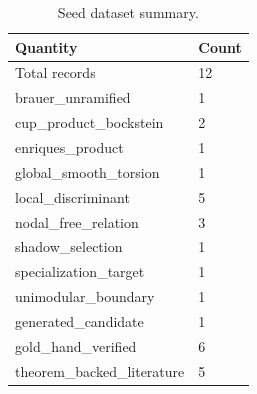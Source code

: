 \begin{table}[h]
\centering
\caption{Seed dataset summary.}
\label{tab:seed-dataset-summary}
\footnotesize
\begin{tabular}{|p{}|p{}|}
\hline
Quantity & Count \\
\hline
Total records & 12 \\
\hline
brauer\_\allowbreak{}unramified & 1 \\
cup\_\allowbreak{}product\_\allowbreak{}bockstein & 2 \\
enriques\_\allowbreak{}product & 1 \\
global\_\allowbreak{}smooth\_\allowbreak{}torsion & 1 \\
local\_\allowbreak{}discriminant & 5 \\
nodal\_\allowbreak{}free\_\allowbreak{}relation & 3 \\
shadow\_\allowbreak{}selection & 1 \\
specialization\_\allowbreak{}target & 1 \\
unimodular\_\allowbreak{}boundary & 1 \\
\hline
generated\_\allowbreak{}candidate & 1 \\
gold\_\allowbreak{}hand\_\allowbreak{}verified & 6 \\
theorem\_\allowbreak{}backed\_\allowbreak{}literature & 5 \\
\hline
\end{tabular}
\end{table}
